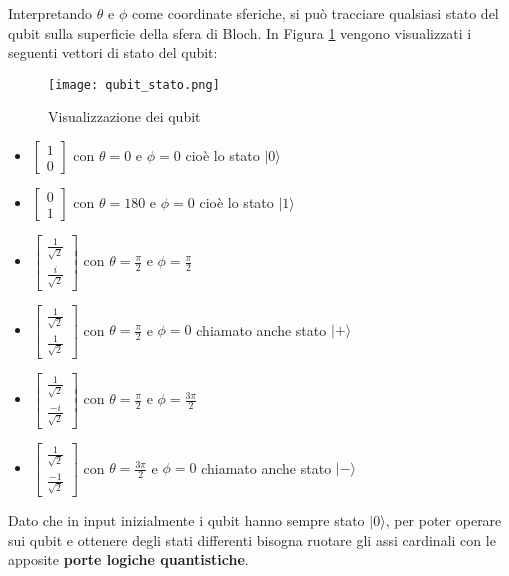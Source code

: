 Interpretando \(\theta\) e \(\phi\) come coordinate sferiche, si può tracciare qualsiasi stato del qubit sulla superficie della sfera di Bloch. In Figura \ref{fig:qubit_stato} vengono visualizzati i seguenti vettori di stato del qubit:

\begin{figure}[h]
  \centering
  \texttt{[image: qubit\_stato.png]}
  \caption{Visualizzazione dei qubit}
  \label{fig:qubit_stato}
\end{figure}

\begin{itemize}
  \item \( \begin{bmatrix} 1 \\ 0 \end{bmatrix} \) con \( \theta = 0 \) e \(\phi = 0\) cioè lo stato \( | 0 \rangle \)
  \item \( \begin{bmatrix} 0 \\ 1 \end{bmatrix} \) con \( \theta = 180 \) e \(\phi = 0\) cioè lo stato \( | 1 \rangle \)
  \item \( \begin{bmatrix} \frac{1}{\sqrt{2}} \\ \frac{i}{\sqrt{2}} \end{bmatrix} \) con \( \theta = \frac{\pi}{2} \) e \( \phi = \frac{\pi}{2} \)
  \item \( \begin{bmatrix} \frac{1}{\sqrt{2}} \\ \frac{1}{\sqrt{2}} \end{bmatrix} \) con \( \theta = \frac{\pi}{2} \) e \( \phi = 0 \) chiamato anche stato \( | + \rangle \)
  \item \( \begin{bmatrix} \frac{1}{\sqrt{2}} \\ \frac{-i}{\sqrt{2}} \end{bmatrix} \) con \( \theta = \frac{\pi}{2} \) e \( \phi = \frac{3\pi}{2} \)
  \item \( \begin{bmatrix} \frac{1}{\sqrt{2}} \\ \frac{-1}{\sqrt{2}} \end{bmatrix} \) con \( \theta = \frac{3\pi}{2} \) e \( \phi = 0 \) chiamato anche stato \( | - \rangle \)
\end{itemize}

Dato che in input inizialmente i qubit hanno sempre stato \( | 0 \rangle \), per poter operare sui qubit e ottenere degli stati differenti bisogna ruotare gli assi cardinali con le apposite \textbf{porte logiche quantistiche}.

